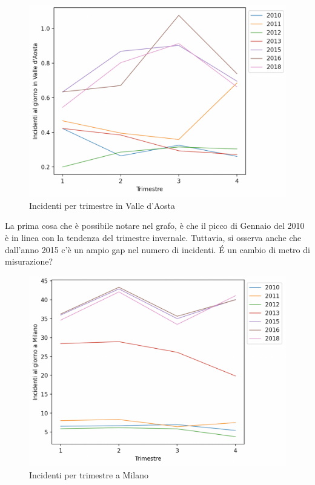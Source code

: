\documentclass[a4paper]{report}
\begin{document}
\begin{figure}
    \includegraphics[width=\linewidth]{../src/incidenti/incidenti_senza_coords/mese_incidenti/aosta_timestre.png}
    \caption{Incidenti per trimestre in Valle d'Aosta}
    \label{fig:aosta-trimestre}
\end{figure}

La prima cosa che è possibile notare nel grafo, è che il picco di Gennaio del 2010 è 
in linea con la tendenza del trimestre invernale. 
Tuttavia, si osserva anche che dall'anno 2015 c'è un ampio gap nel numero di incidenti. 
\'E un cambio di metro di misurazione? 

\begin{figure}
    \includegraphics[width=\linewidth]{../src/incidenti/incidenti_senza_coords/mese_incidenti/milano_trimestre.png}
    \caption{Incidenti per trimestre a Milano}
    \label{fig:milano-trimestre}
\end{figure}
\end{document}
